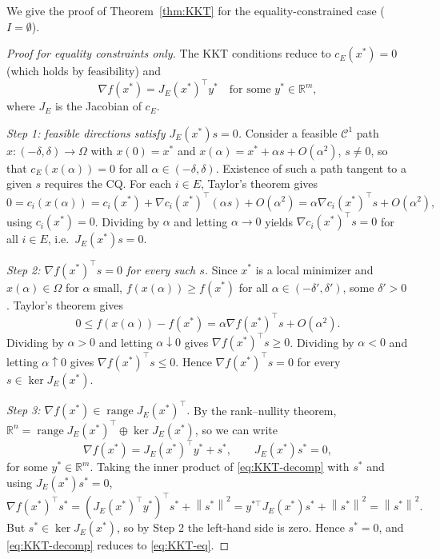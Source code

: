 \documentclass[11pt,a4paper]{report}
\theoremstyle{plain}
\theoremstyle{definition}
\newcommand{\R}{\mathbb{R}}
\newcommand{\norm}[1]{\left\lVert#1\right\rVert}
\newcommand{\grad}{\nabla}
\DeclareMathOperator{\range}{range}
\newcommand{\trans}{^{\top}}
\begin{document}
We give the proof of Theorem~\ref{thm:KKT} for the equality-constrained case ($I=\emptyset$).

\begin{proof}[Proof for equality constraints only]
The KKT conditions reduce to $c_{E}(x^{*})=0$ (which holds by feasibility) and
\begin{equation}\label{eq:KKT-eq}
\grad f(x^{*})=J_{E}(x^{*})\trans y^{*}\quad\text{for some }y^{*}\in\R^{m},
\end{equation}
where $J_{E}$ is the Jacobian of $c_{E}$.

\emph{Step 1: feasible directions satisfy $J_{E}(x^{*})s=0$.} Consider a feasible $\mathcal{C}^{1}$ path $x:(-\delta,\delta)\to\Omega$ with
$x(0)=x^{*}$ and $x(\alpha)=x^{*}+\alpha s+O(\alpha^{2})$, $s\ne 0$, so that
$c_{E}(x(\alpha))=0$ for all $\alpha\in(-\delta,\delta)$. Existence of such a
path tangent to a given $s$ requires the CQ. For each $i\in E$, Taylor's
theorem gives
\[
0=c_{i}(x(\alpha))=c_{i}(x^{*})+\grad c_{i}(x^{*})\trans(\alpha s)+O(\alpha^{2})
=\alpha\grad c_{i}(x^{*})\trans s+O(\alpha^{2}),
\]
using $c_{i}(x^{*})=0$. Dividing by $\alpha$ and letting $\alpha\to 0$ yields
$\grad c_{i}(x^{*})\trans s=0$ for all $i\in E$, i.e.\ $J_{E}(x^{*})s=0$.

\emph{Step 2: $\grad f(x^{*})\trans s=0$ for every such $s$.} Since $x^{*}$ is
a local minimizer and $x(\alpha)\in\Omega$ for $\alpha$ small,
$f(x(\alpha))\ge f(x^{*})$ for all $\alpha\in(-\delta',\delta')$, some
$\delta'>0$. Taylor's theorem gives
\[
0\le f(x(\alpha))-f(x^{*})=\alpha\grad f(x^{*})\trans s+O(\alpha^{2}).
\]
Dividing by $\alpha>0$ and letting $\alpha\downarrow 0$ gives
$\grad f(x^{*})\trans s\ge 0$. Dividing by $\alpha<0$ and letting
$\alpha\uparrow 0$ gives $\grad f(x^{*})\trans s\le 0$. Hence
$\grad f(x^{*})\trans s=0$ for every $s\in\ker J_{E}(x^{*})$.

\emph{Step 3: $\grad f(x^{*})\in\range J_{E}(x^{*})\trans$.}
By the rank--nullity theorem, $\R^{n}=\range J_{E}(x^{*})\trans
\oplus\ker J_{E}(x^{*})$, so we can write
\begin{equation}\label{eq:KKT-decomp}
\grad f(x^{*})=J_{E}(x^{*})\trans y^{*}+s^{*},\qquad J_{E}(x^{*})s^{*}=0,
\end{equation}
for some $y^{*}\in\R^{m}$. Taking the inner product of \eqref{eq:KKT-decomp}
with $s^{*}$ and using $J_{E}(x^{*})s^{*}=0$,
\[
\grad f(x^{*})\trans s^{*}=(J_{E}(x^{*})\trans y^{*})\trans s^{*}+\norm{s^{*}}^{2}
=y^{*\top}J_{E}(x^{*})s^{*}+\norm{s^{*}}^{2}=\norm{s^{*}}^{2}.
\]
But $s^{*}\in\ker J_{E}(x^{*})$, so by Step 2 the left-hand side is zero.
Hence $s^{*}=0$, and \eqref{eq:KKT-decomp} reduces to \eqref{eq:KKT-eq}.
\end{proof}
\end{document}
